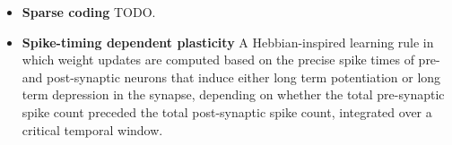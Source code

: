 \begin{itemize}
\item \textbf{Sparse coding} TODO.

\item \textbf{Spike-timing dependent plasticity}  A Hebbian-inspired learning rule in which weight updates are computed based on the precise spike times of pre- and post-synaptic neurons that induce either long term potentiation or long term depression in the synapse, depending on whether the total pre-synaptic spike count preceded the total post-synaptic spike count, integrated over a critical temporal window.

\end{itemize}
